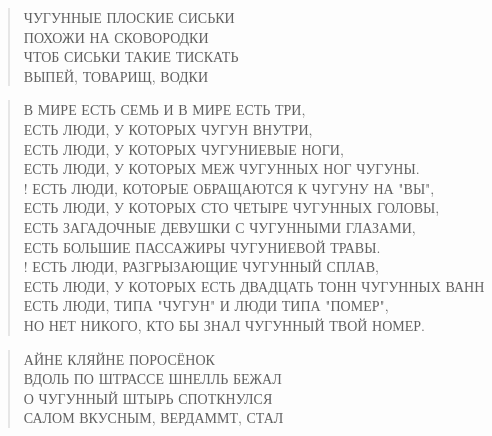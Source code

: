 \poemtitle{***}
\begin{verse}
ЧУГУННЫЕ ПЛОСКИЕ СИСЬКИ\\
ПОХОЖИ НА СКОВОРОДКИ\\
ЧТОБ СИСЬКИ ТАКИЕ ТИСКАТЬ\\
ВЫПЕЙ, ТОВАРИЩ, ВОДКИ
\end{verse}

\poemtitle{***}
\begin{verse}
В МИРЕ ЕСТЬ СЕМЬ И В МИРЕ ЕСТЬ ТРИ,\\
ЕСТЬ ЛЮДИ, У КОТОРЫХ ЧУГУН ВНУТРИ,\\
ЕСТЬ ЛЮДИ, У КОТОРЫХ ЧУГУНИЕВЫЕ НОГИ,\\
ЕСТЬ ЛЮДИ, У КОТОРЫХ МЕЖ ЧУГУННЫХ НОГ ЧУГУНЫ.\\!
ЕСТЬ ЛЮДИ, КОТОРЫЕ ОБРАЩАЮТСЯ К ЧУГУНУ НА "ВЫ",\\
ЕСТЬ ЛЮДИ, У КОТОРЫХ СТО ЧЕТЫРЕ ЧУГУННЫХ ГОЛОВЫ,\\
ЕСТЬ ЗАГАДОЧНЫЕ ДЕВУШКИ С ЧУГУННЫМИ ГЛАЗАМИ,\\
ЕСТЬ БОЛЬШИЕ ПАССАЖИРЫ ЧУГУНИЕВОЙ ТРАВЫ.\\!
ЕСТЬ ЛЮДИ, РАЗГРЫЗАЮЩИЕ ЧУГУННЫЙ СПЛАВ,\\
ЕСТЬ ЛЮДИ, У КОТОРЫХ ЕСТЬ ДВАДЦАТЬ ТОНН ЧУГУННЫХ ВАНН\\
ЕСТЬ ЛЮДИ, ТИПА "ЧУГУН" И ЛЮДИ ТИПА "ПОМЕР",\\
НО НЕТ НИКОГО, КТО БЫ ЗНАЛ ЧУГУННЫЙ ТВОЙ НОМЕР.
\end{verse}

\poemtitle{***}
\begin{verse}
АЙНЕ КЛЯЙНЕ ПОРОСЁНОК \\
ВДОЛЬ ПО ШТРАССЕ ШНЕЛЛЬ БЕЖАЛ\\
О ЧУГУННЫЙ ШТЫРЬ СПОТКНУЛСЯ\\
САЛОМ ВКУСНЫМ, ВЕРДАММТ, СТАЛ
\end{verse}

